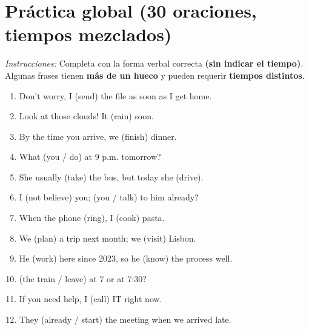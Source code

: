 \documentclass[11pt,a4paper]{article}
\begin{document}
\section{Práctica global (30 oraciones, tiempos mezclados)}
\textit{Instrucciones:} Completa con la forma verbal correcta \textbf{(sin indicar el tiempo)}. Algunas frases tienen \textbf{más de un hueco} y pueden requerir \textbf{tiempos distintos}.
\begin{enumerate}
  \item Don’t worry, I \underline{\hspace{2.2cm}} (send) the file as soon as I get home.
  \item Look at those clouds! It \underline{\hspace{2.2cm}} (rain) soon.
  \item By the time you arrive, we \underline{\hspace{2.2cm}} (finish) dinner.
  \item What \underline{\hspace{2.2cm}} (you / do) at 9 p.m. tomorrow?
  \item She usually \underline{\hspace{2.2cm}} (take) the bus, but today she \underline{\hspace{2.2cm}} (drive).
  \item I \underline{\hspace{2.2cm}} (not believe) you; \underline{\hspace{2.2cm}} (you / talk) to him already?
  \item When the phone \underline{\hspace{2.2cm}} (ring), I \underline{\hspace{2.2cm}} (cook) pasta.
  \item We \underline{\hspace{2.2cm}} (plan) a trip next month; we \underline{\hspace{2.2cm}} (visit) Lisbon.
  \item He \underline{\hspace{2.2cm}} (work) here since 2023, so he \underline{\hspace{2.2cm}} (know) the process well.
  \item \underline{\hspace{2.2cm}} (the train / leave) at 7 or at 7:30?
  \item If you need help, I \underline{\hspace{2.2cm}} (call) IT right now.
  \item They \underline{\hspace{2.2cm}} (already / start) the meeting when we arrived late.

\end{enumerate}
\end{document}

